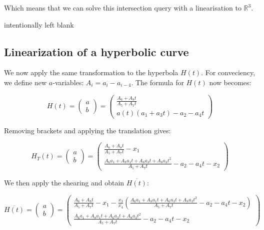 \documentclass{article}
\begin{document}
Which means that we can solve this intersection query with a linearisation to $\mathbb{R}^3$.

intentionally left blank

\newpage
\subsection{Linearization of a hyperbolic curve}

We now apply the same transformation to the hyperbola $H(t)$. For conveciency, we define new $a$-variables:
$A_i = a_i - a_{i-4}$.
The formula for $H(t)$ now becomes:

\begin{equation}
  H(t) = \left( \begin{array}{c}
         a  \\
         b 
    \end{array}  \right) =  
        \left( \begin{array}{c}
         \frac{ A_6 + A_8 t}
      { A_5  + A_7 t } \\
         a(t)(a_1 +  a_3 t) - a_2 -  a_4 t 
    \end{array}  \right)
\end{equation}

Removing brackets and applying the translation gives:

  \begin{equation*}
   H_T(t) = \left( \begin{array}{c}
         a  \\
         b 
    \end{array}  \right) = 
    \left( \begin{array}{c}
         \frac{ A_6 + A_8 t}
      { A_5  + A_7 t } - x_1 \\
         \frac{ A_6 a_1 + A_8 a_1 t + A_6 a_3 t + A_8 a_3 t^2 }{A_5 + A_7t} - a_2 - a_4 t - x_2
    \end{array}  \right)
  \end{equation*}
  
We then apply the shearing and obtain $\overline{H(t)}$:

\begin{equation*}
   \overline{H(t)} = \left( \begin{array}{c}
         a  \\
         b 
    \end{array}  \right) = 
    \left( \begin{array}{c}
       \frac{ A_6 + A_8 t}
      { A_5  + A_7 t } - x_1 - \frac{x_3}{x_4} \left( \frac{ A_6 a_1 + A_8 a_1 t + A_6 a_3 t + A_8 a_3 t^2 }{A_5 + A_7t} - a_2 - a_4 t - x_2 \right)  \\
         \frac{ A_6 a_1 + A_8 a_1 t + A_6 a_3 t + A_8 a_3 t^2 }{A_5 + A_7t} - a_2 - a_4 t - x_2
    \end{array}  \right)
\end{equation*}
\end{document}
